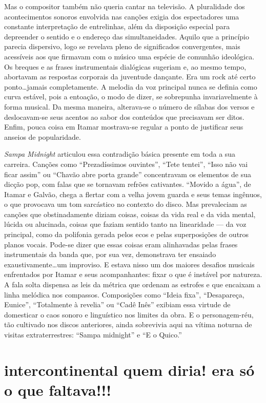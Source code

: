 Mas o compositor também não queria cantar na televisão. A pluralidade
dos acontecimentos sonoros envolvida nas canções exigia dos espectadores
uma constante interpretação de entrelinhas, além da disposição especial
para depreender o sentido e o endereço das simultaneidades. Aquilo que a
princípio parecia dispersivo, logo se revelava pleno de significados
convergentes, mais acessíveis aos que firmavam com o músico uma espécie
de comunhão ideológica. Os breques e as frases instrumentais dialógicas
sugeriam e, ao mesmo tempo, abortavam as respostas corporais da
juventude dançante. Era um rock até certo ponto\ldots jamais completamente.
A melodia da voz principal nunca se definia como curva estável, pois a
entoação, o modo de dizer, se sobrepunha invariavelmente à forma
musical. Da mesma maneira, alterava-se o número de sílabas dos versos e
deslocavam-se seus acentos ao sabor dos conteúdos que precisavam ser
ditos. Enfim, pouca coisa em Itamar mostrava-se regular a ponto de
justificar seus anseios de popularidade.

\textit{Sampa Midnight} articulou essa contradição básica presente em toda a sua
carreira. Canções como ``Prezadíssimos ouvintes'', ``Tete tentei'', ``Isso não vai
ficar assim'' ou ``Chavão abre porta grande'' concentravam os elementos de sua
dicção pop, com falas que se tornavam refrões cativantes. ``Movido a água'', de Itamar e Galvão, chega a flertar com a velha jovem guarda e seus temas
ingênuos, o que provocava um tom sarcástico no contexto do disco. Mas
prevaleciam as canções que obstinadamente diziam coisas, coisas da vida
real e da vida mental, lúcida ou alucinada, coisas que faziam sentido
tanto na linearidade --- da voz principal, como da polifonia gerada pelos
ecos e pelas superposições de outros planos vocais. Pode-se dizer que
essas coisas eram alinhavadas pelas frases instrumentais da banda que,
por sua vez, demonstrava ter ensaiado exaustivamente\ldots um improviso. E
estava nisso um dos maiores desafios musicais enfrentados por Itamar e
seus acompanhantes: fixar o que é instável por natureza. A fala solta
dispensa as leis da métrica que ordenam as estrofes e que encaixam a
linha melódica nos compassos. Composições como ``Ideia fixa'', ``Desapareça,
Eunice'', ``Totalmente à revelia'' ou ``Cadê Inês'' exibiam essa virtude de
domesticar o caos sonoro e linguístico nos limites da obra. E o
personagem-réu, tão cultivado nos discos anteriores, ainda sobrevivia
aqui na vítima noturna de visitas extraterrestres: ``Sampa midnight'' e ``E o
Quico.''

\section{intercontinental quem diria! era só o que faltava!!!}

